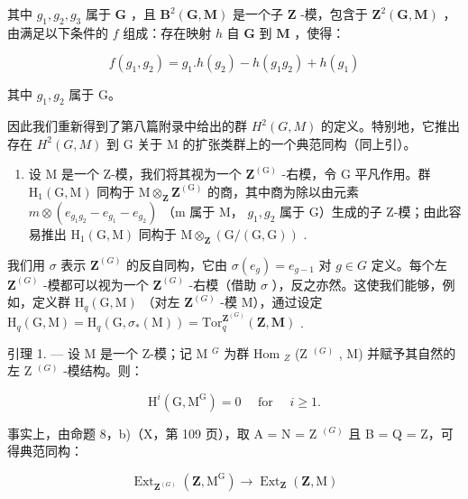 其中 \(g_{1}, g_{2}, g_{3}\) 属于 \(\mathbf{G}\) ，且 \(\mathbf{B}^{2}(\mathbf{G}, \mathbf{M})\) 是一个子 \(\mathbf{Z}\) -模，包含于 \(\mathbf{Z}^{2}(\mathbf{G}, \mathbf{M})\) ，由满足以下条件的 \(f\) 组成：存在映射 \(h\) 自 \(\mathbf{G}\) 到 \(\mathbf{M}\) ，使得：

\[
f (g _ {1}, g _ {2}) = g _ {1}. h (g _ {2}) - h (g _ {1} g _ {2}) + h (g _ {1})
\]

其中 \(g_{1}, g_{2}\) 属于 G。

因此我们重新得到了第八篇附录中给出的群 \(H^{2}(G, M)\) 的定义。特别地，它推出存在 \(H^{2}(G, M)\) 到 G 关于 M 的扩张类群上的一个典范同构（同上引）。

\begin{enumerate}
\def\labelenumi{\arabic{enumi})}
\setcounter{enumi}{3}
\tightlist
\item
  设 M 是一个 Z-模，我们将其视为一个 \(\mathbf{Z}^{(\mathrm{G})}\) -右模，令 G 平凡作用。群 \(\mathrm{H}_{1}(\mathrm{G},\mathrm{M})\) 同构于 \(\mathrm{M}\otimes_{\mathbf{Z}}\mathbf{Z}^{(\mathrm{G})}\) 的商，其中商为除以由元素 \(m\otimes(e_{g_{1}g_{2}}-e_{g_{1}}-e_{g_{2}})\) （m 属于 M， \(g_{1}, g_{2}\) 属于 G）生成的子 Z-模；由此容易推出 \(\mathrm{H}_{1}(\mathrm{G},\mathrm{M})\) 同构于 \(\mathrm{M}\otimes_{\mathbf{Z}}(\mathrm{G}/(\mathrm{G},\mathrm{G}))\) .
\end{enumerate}

我们用 \(\sigma\) 表示 \(\mathbf{Z}^{(G)}\) 的反自同构，它由 \(\sigma(e_g) = e_{g-1}\) 对 \(g \in G\) 定义。每个左 \(\mathbf{Z}^{(G)}\) -模都可以视为一个 \(\mathbf{Z}^{(G)}\) -右模（借助 \(\sigma\) ），反之亦然。这使我们能够，例如，定义群 \(\mathrm{H}_q(\mathrm{G}, \mathrm{M})\) （对左 \(\mathbf{Z}^{(G)}\) -模 M），通过设定 \(\mathrm{H}_q(\mathrm{G}, \mathrm{M}) = \mathrm{H}_q(\mathrm{G}, \sigma_*(\mathrm{M})) = \mathrm{Tor}_q^{\mathbf{Z}^{(G)}}(\mathbf{Z}, \mathbf{M})\) .

引理 1. --- 设 M 是一个 Z-模；记 M \(^{G}\) 为群 Hom \(_{Z}\) (Z \(^{(G)}\) , M) 并赋予其自然的左 Z \(^{(G)}\) -模结构。则：

\[
\mathrm{H} ^ {i} (\mathrm{G}, \mathrm{M} ^ {\mathrm{G}}) = 0 \quad \text { for } \quad i \geqslant 1.
\]

事实上，由命题 8，b)（X，第 109 页），取 A = N = Z \(^{(G)}\) 且 B = Q = Z，可得典范同构：

\[
\operatorname{Ext} _ {\mathbf {Z} ^ {(G)}} \left(\mathbf {Z}, \mathrm{M} ^ {\mathrm{G}}\right)\rightarrow \operatorname{Ext} _ {\mathbf {Z}} (\mathbf {Z}, \mathrm{M})
\]

